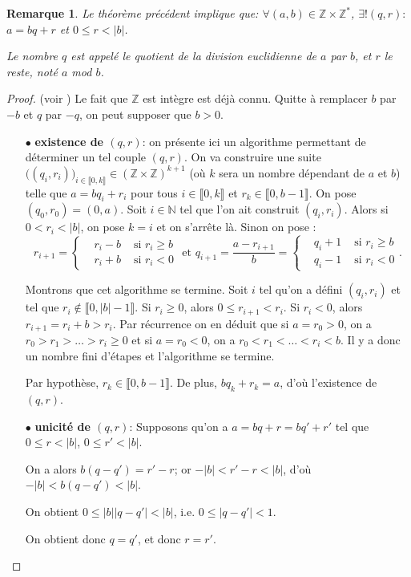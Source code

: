 \documentclass[10pt,a4paper]{report}
\newtheorem*{rem}{Remarque}
\newcommand{\N}{\mathbb{N}}
\newcommand{\Z}{\mathbb{Z}}
\begin{document}
\begin{rem}
Le théorème précédent implique que: $\forall (a,b) \in \mathbb{Z}\times \mathbb{Z}^*$, $\exists ! (q,r):$ $a=bq+r$ et $0 \leqslant r < |b|$.\par 
Le nombre $q$ est appelé le quotient de la division euclidienne de $a$ par $b$, et $r$ le reste, noté $a$ mod $b$.
\end{rem}

\begin{proof}(voir \cite{demazure2008cours})
Le fait que $\mathbb{Z}$ est intègre est déjà connu. Quitte à remplacer $b$ par $-b$ et  $q$ par $-q$, on peut supposer que $b>0$. 

\begin{itemize}

\item[$\bullet$] \textbf{existence de $(q,r)$}: on présente ici un algorithme permettant de déterminer un tel couple $(q,r)$.  On va construire une suite $\big((q_i,r_i)\big)_{i\in \llbracket 0,k\rrbracket}\in (\Z\times \Z)^{k+1}$ (où $k$ sera un nombre dépendant de $a$ et $b$) telle que $a=b q_i+r_i$ pour tous $i\in \llbracket 0,k\rrbracket$ et $r_k\in \llbracket 0,b-1\rrbracket$.  On pose $(q_0,r_0)=(0,a)$. Soit $i\in \N$ tel que l'on ait construit $(q_i,r_i)$. Alors si $0< r_i<|b|$, on pose $k=i$ et on s'arrête là. Sinon on pose : \[ r_{i+1}=\left\{\begin{aligned} &r_i-b &\text{ si }r_i\geq b\\
&r_i+b &\text{ si }r_i< 0\end{aligned}\right. \text{ et }q_{i+1}=\frac{a-r_{i+1}}{b}=\left\{\begin{aligned} &q_i+1&\text{ si }r_i\geq b\\
&q_i-1  &\text{ si }r_i< 0\end{aligned}\right..\]

Montrons que cet algorithme se termine. Soit $i$ tel qu'on a défini $(q_i,r_i)$ et tel que $r_i\notin \llbracket 0, |b|-1\rrbracket$. Si $r_i\geq 0$, alors $0\leq r_{i+1}<r_i$. Si $r_i<0$, alors $r_{i+1}=r_i+b>r_i$. Par récurrence on en déduit que si $a=r_0> 0$, on a $r_0>r_1>\ldots> r_i \geq 0$ et si $a=r_0<0$, on a $r_0<r_1<\ldots < r_i < b$. Il y a donc un nombre fini d'étapes et l'algorithme se termine.

Par hypothèse, $r_k\in \llbracket 0, b-1\rrbracket$. De plus,  $bq_k+r_k=a$, d'où l'existence de $(q,r)$.

\item[$\bullet$] \textbf{unicité de $(q,r)$}: Supposons qu'on a $a=bq+r=bq'+r'$ tel que $0 \leq r < |b|$, $0 \leq r' < |b|$. \par 
On a alors $b(q-q')=r'-r$; or $-|b|<r'-r<|b|$, d'où $-|b|<b(q-q')<|b|$. \par 
On obtient $0 \leq |b| |q-q'|<|b|$, i.e. $0 \leq |q-q'|<1$. \par 
On obtient donc $q=q'$, et donc $r=r'$.

\end{itemize}

\end{proof}
\end{document}
